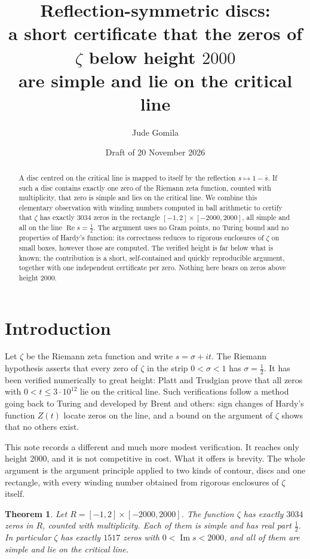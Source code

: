 \documentclass[11pt,a4paper]{article}
\title{Reflection-symmetric discs:\\
a short certificate that the zeros of $\zeta$ below height $2000$\\
are simple and lie on the critical line}
\author{Jude Gomila}
\date{Draft of 20 November 2026}
\newtheorem{theorem}{Theorem}
\theoremstyle{definition}
\newcommand{\conj}[1]{\overline{#1}}
\DeclareMathOperator{\re}{Re}
\DeclareMathOperator{\im}{Im}
\begin{document}
\maketitle

\begin{abstract}
A disc centred on the critical line is mapped to itself by the reflection
$s \mapsto 1-\conj{s}$. If such a disc contains exactly one zero of the
Riemann zeta function, counted with multiplicity, that zero is simple and
lies on the critical line. We combine this elementary observation with
winding numbers computed in ball arithmetic to certify that $\zeta$ has
exactly $3034$ zeros in the rectangle $[-1,2]\times[-2000,2000]$, all simple
and all on the line $\re s=\tfrac12$. The argument uses no Gram points, no
Turing bound and no properties of Hardy's function: its correctness reduces to
rigorous enclosures of $\zeta$ on small boxes, however those are computed. The verified
height is far below what is known; the contribution is a short, self-contained
and quickly reproducible argument, together with one independent certificate
per zero. Nothing here bears on zeros above height $2000$.
\end{abstract}

\section{Introduction}

Let $\zeta$ be the Riemann zeta function and write $s=\sigma+it$. The Riemann
hypothesis asserts that every zero of $\zeta$ in the strip $0<\sigma<1$ has
$\sigma=\tfrac12$. It has been verified numerically to great height: Platt and
Trudgian \cite{PlattTrudgian} prove that all zeros with $0<t\le 3\cdot 10^{12}$
lie on the critical line. Such verifications follow a method
going back to Turing \cite{Turing} and developed by Brent \cite{Brent} and
others: sign changes of Hardy's function $Z(t)$ locate zeros on the line, and
a bound on the argument of $\zeta$ shows that no others exist.

This note records a different and much more modest verification. It reaches
only height $2000$, and it is not competitive in cost. What it offers is
brevity. The whole argument is the argument principle applied to two kinds of
contour, discs and one rectangle, with every winding number obtained from
rigorous enclosures of $\zeta$ itself.

\begin{theorem}\label{thm:main}
Let $R=[-1,2]\times[-2000,2000]$. The function $\zeta$ has exactly $3034$
zeros in $R$, counted with multiplicity. Each of them is simple and has real
part $\tfrac12$. In particular $\zeta$ has exactly $1517$ zeros with
$0<\im s<2000$, and all of them are simple and lie on the critical line.
\end{theorem}
\end{document}
